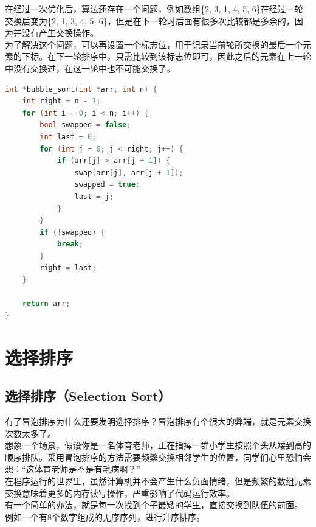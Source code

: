 在经过一次优化后，算法还存在一个问题，例如数组\{2, 3, 1, 4, 5, 6\}在经过一轮交换后变为\{2, 1, 3, 4, 5, 6\}，但是在下一轮时后面有很多次比较都是多余的，因为并没有产生交换操作。\\

为了解决这个问题，可以再设置一个标志位，用于记录当前轮所交换的最后一个元素的下标。在下一轮排序中，只需比较到该标志位即可，因此之后的元素在上一轮中没有交换过，在这一轮中也不可能交换了。\\


\begin{lstlisting}[language=C++]
int *bubble_sort(int *arr, int n) {
	int right = n - 1;
	for (int i = 0; i < n; i++) {
		bool swapped = false;
		int last = 0;
		for (int j = 0; j < right; j++) {
			if (arr[j] > arr[j + 1]) {
				swap(arr[j], arr[j + 1]);
				swapped = true;
				last = j;
			}
		}
		if (!swapped) {
			break;
		}
		right = last;
	}

	return arr;
}
\end{lstlisting}

\newpage

\section{选择排序}

\subsection{选择排序（Selection Sort）}

有了冒泡排序为什么还要发明选择排序？冒泡排序有个很大的弊端，就是元素交换次数太多了。\\

想象一个场景，假设你是一名体育老师，正在指挥一群小学生按照个头从矮到高的顺序排队。采用冒泡排序的方法需要频繁交换相邻学生的位置，同学们心里恐怕会想：“这体育老师是不是有毛病啊？”\\

在程序运行的世界里，虽然计算机并不会产生什么负面情绪，但是频繁的数组元素交换意味着更多的内存读写操作，严重影响了代码运行效率。\\

有一个简单的办法，就是每一次找到个子最矮的学生，直接交换到队伍的前面。\\

例如一个有8个数字组成的无序序列，进行升序排序。

